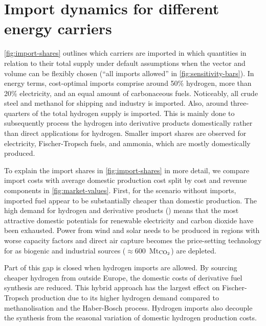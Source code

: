 \section*{Import dynamics for different energy carriers}


\cref{fig:import-shares} outlines which carriers are imported in which
quantities in relation to their total supply under default assumptions when the
vector and volume can be flexibly chosen (``all imports allowed'' in
\cref{fig:sensitivity-bars}). In energy terms, cost-optimal imports comprise
around 50\% hydrogen, more than 20\% electricity, and an equal amount of
carbonaceous fuels. Noticeably, all crude steel and methanol for shipping and
industry is imported. Also, around three-quarters of the total hydrogen supply
is imported. This is mainly done to subsequently process the hydrogen into
derivative products domestically rather than direct applications for hydrogen.
Smaller import shares are observed for electricity, Fischer-Tropsch fuels, and
ammonia, which are mostly domestically produced.


To explain the import shares in \cref{fig:import-shares} in more detail, we
compare import costs with average domestic production cost split by cost and
revenue components in \cref{fig:market-values}. First, for the scenario without
imports, imported fuel appear to be substantially cheaper than domestic
production. The high demand for hydrogen and derivative products
() means that the most attractive
domestic potentials for renewable electricity and carbon dioxide have been
exhausted. Power from wind and solar needs to be produced in regions with worse
capacity factors and direct air capture becomes the price-setting technology for
 as biogenic and industrial sources ($\approx$600~Mt$_\text{\ce{CO2}}$)
are depleted.


Part of this gap is closed when hydrogen imports are allowed. By sourcing
cheaper hydrogen from outside Europe, the domestic costs of derivative fuel
synthesis are reduced. This hybrid approach has the largest effect on
Fischer-Tropsch production due to its higher hydrogen demand compared to
methanolisation and the Haber-Bosch process. Hydrogen imports also decouple the
synthesis from the seasonal variation of domestic hydrogen production costs.

